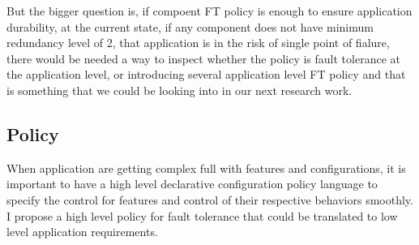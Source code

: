But the bigger question is, if compoent FT policy is enough to ensure
application durability, at the current state, if any component does not have
minimum redundancy level of 2, that application is in the risk of single point
of fialure, there would be needed a way to inspect whether the policy is fault
tolerance at the application level, or introducing several application level FT
policy and that is something that we could be looking into in our next
research work.

\subsection{Policy}


When application are getting complex full with features and configurations, 
it is important to have a high level declarative configuration policy language 
to specify the control for features and control of their respective behaviors 
smoothly. I propose a high level policy for fault tolerance that could be
translated to low level application requirements.
